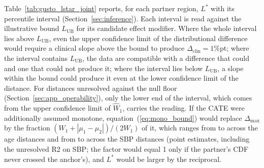 \documentclass[AMA,Times1COL]{WileyNJDv5}
\begin{document}
Table~\ref{tab:gusto_lstar_joint} reports, for each partner region, $L^*$ with its percentile interval (Section~\ref{sec:inference}). Each interval is read against the illustrative bound $L_{\text{UB}}$ for its candidate effect modifier. Where the whole interval lies above $L_{\text{UB}}$, even the upper confidence limit of the distributional difference would require a clinical slope above the bound to produce $\Delta_{\text{clin}} = 1$\%pt; where the interval contains $L_{\text{UB}}$, the data are compatible with a difference that could and one that could not produce it; where the interval lies below $L_{\text{UB}}$, a slope within the bound could produce it even at the lower confidence limit of the distance. For distances unresolved against the null floor (Section~\ref{sec:app_operability}), only the lower end of the interval, which comes from the upper confidence limit of $\widehat{W}_1$, carries the reading. If the CATE were additionally assumed monotone, equation~(\ref{eq:mono_bound}) would replace $\Delta_{\max}$ by the fraction $(W_1 + |\mu_1 - \mu_2|)/(2 W_1)$ of it, which ranges from  to  across the age distances and from  to  across the SBP distances (point estimates, including the unresolved R2 on SBP; the factor would equal 1 only if the partner's CDF never crossed the anchor's), and $L^*$ would be larger by the reciprocal.
\end{document}
